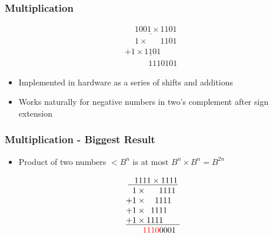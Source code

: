 \documentclass[aspectratio=169]{beamer}
\newif\iftransitions
\begin{document}
\begin{frame}
  \frametitle{Multiplication}
  
  \begin{equation*}\begin{array}{c}
   \underline{\phantom{+}1001 \times 1101}\\
   \phantom{+}1 \times \phantom{999}1101\phantom{9} \\
   \underline{+ 1 \times 1101\phantom{9999}} \\
   \phantom{+ 11 \times }1110101\phantom{9}
  \end{array}\end{equation*}
  
  \begin{itemize}
  \item Implemented in hardware as a series of shifts and additions \iftransitions \pause \fi 
  \item Works naturally for negative numbers in two's complement after sign extension
  \end{itemize}
\end{frame}

\begin{frame}
  \frametitle{Multiplication - Biggest Result}
  
  \begin{itemize}
  \item Product of two numbers $< B^n$ is  at most $B^n \times B^n = B^{2n}$
  \end{itemize}
  
  \iftransitions \pause \fi 
  
  \begin{equation*}\begin{array}{c}
   \underline{\phantom{+}1111 \times 1111}\\
   \phantom{+}1 \times \phantom{999}1111\phantom{9} \\
   +1 \times \phantom{99}1111\phantom{99} \\
   +1 \times \phantom{9}1111\phantom{999} \\
   \underline{+ 1 \times 1111\phantom{9999}} \\
   \phantom{+ 1 \times }\textcolor{red}{1110}0001\phantom{9}
  \end{array}\end{equation*}
  
\end{frame}
\end{document}
